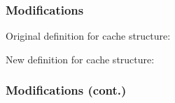 \documentclass{beamer}
\begin{document}
\begin{frame}
  \frametitle{Modifications}

  Original definition for cache structure:
  \begin{adjustbox}{width=\textwidth,keepaspectratio}
    
  \end{adjustbox}

  \vspace{\baselineskip}

  New definition for cache structure:
  \begin{adjustbox}{width=\textwidth,keepaspectratio}
    
  \end{adjustbox}

\end{frame}

\begin{frame}
  \frametitle{Modifications (cont.)}

  \begin{adjustbox}{width=\textwidth,keepaspectratio}
    
  \end{adjustbox}

\end{frame}
\end{document}
